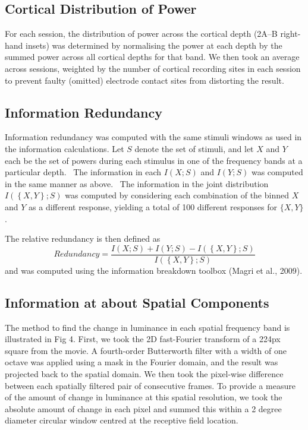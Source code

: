 \subsection[Cortical Distribution of Power]{Cortical Distribution of Power}
For each session, the distribution of power across the cortical depth (2A--B right-hand insets) was determined by normalising the power at each depth by the summed power across all cortical depths for that band.
We then took an average across sessions, weighted by the number of cortical recording sites in each session to prevent faulty (omitted) electrode contact sites from distorting the result.

\subsection{Information Redundancy }
Information redundancy was computed with the same stimuli windows as used in the information calculations.
Let  $S$ denote the set of stimuli, and let  $X$ and  $Y$ each be the set of powers during each stimulus in one of the frequency bands at a particular depth.
\ The information in each  $I\left(X;S\right)$ and  $I(Y;S)$ was computed in the same manner as above.
\ The information in the joint distribution  $I(\left\{X,Y\right\};S)$ was computed by considering each combination of the binned  $X$ and  $Y$ as a different response, yielding a total of 100 different responses for  $\{X,Y\}$.

The relative redundancy is then defined as
\begin{equation*}
\mathit{Redundancy}=\frac{I\left(X;S\right)+I\left(Y;S\right)-I\left(\left\{X,Y\right\};S\right)}{I\left(\left\{X,Y\right\};S\right)}
\end{equation*}
and was computed using the information breakdown toolbox (Magri et al., 2009).


\subsection{Information at about Spatial Components}
The method to find the change in luminance in each spatial frequency band is illustrated in Fig 4.
First, we took the 2D fast-Fourier transform of a 224px square from the movie.
A fourth-order Butterworth filter with a width of one octave was applied using a mask in the Fourier domain, and the result was projected back to the spatial domain.
We then took the pixel-wise difference between each spatially filtered pair of consecutive frames.
To provide a measure of the amount of change in luminance at this spatial resolution, we took the absolute amount of change in each pixel and summed this within a 2 degree diameter circular window centred at the receptive field location.

